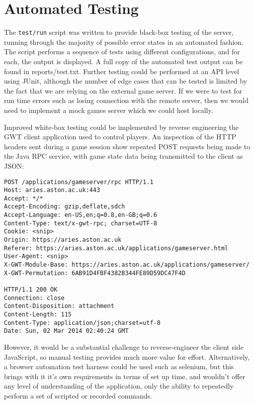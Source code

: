 \documentclass[12pt,a4paper]{article}
\begin{document}
\newpage
\section{Automated Testing}

The \texttt{test/run} script was written to provide black-box testing
of the server, running through the majority of possible error states
in an automated fashion. The script performs a sequence of tests using
different configurations, and for each, the output is displayed. A
full copy of the automated test output can be found in
reports/test.txt. Further testing could be performed at an API level
using JUnit, although the number of edge cases that can be tested is
limited by the fact that we are relying on the external game
server. If we were to test for run time errors such as losing
connection with the remote server, then we would need to implement a
mock games server which we could host locally.

Improved white-box testing could be implemented by reverse engineering
the GWT client application used to control players. An inspection of
the HTTP headers sent during a game session show repeated POST
requests being made to the Java RPC service, with game state data
being transmitted to the client as JSON:

\begin{verbatim}
POST /applications/gameserver/rpc HTTP/1.1
Host: aries.aston.ac.uk:443
Accept: */*
Accept-Encoding: gzip,deflate,sdch
Accept-Language: en-US,en;q=0.8,en-GB;q=0.6
Content-Type: text/x-gwt-rpc; charset=UTF-8
Cookie: <snip>
Origin: https://aries.aston.ac.uk
Referer: https://aries.aston.ac.uk/applications/gameserver.html
User-Agent: <snip>
X-GWT-Module-Base: https://aries.aston.ac.uk/applications/gameserver/
X-GWT-Permutation: 6AB91D4FBF4382B344FE89D59DC47F4D

HTTP/1.1 200 OK
Connection: close
Content-Disposition: attachment
Content-Length: 115
Content-Type: application/json;charset=utf-8
Date: Sun, 02 Mar 2014 02:40:24 GMT
\end{verbatim}

However, it would be a substantial challenge to reverse-engineer the
client side JavaScript, so manual testing provides much more value for
effort. Alternatively, a browser automation test harness could be used
such as selenium, but this brings with it it's own requirements in
terms of set up time, and wouldn't offer any level of understanding of
the application, only the ability to repeatedly perform a set of
scripted or recorded commands.
\end{document}
